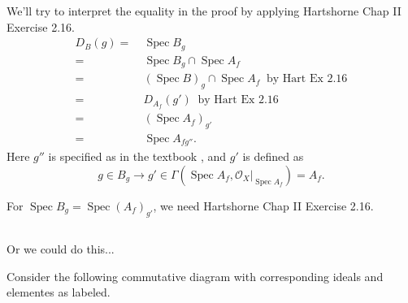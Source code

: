 \section{}
We'll try to interpret the equality in the proof by applying Hartshorne \cite{hartshorne2013algebraic} Chap II Exercise 2.16.
\begin{align*}
	D_B(g)=&~ \operatorname{Spec}B_g\\
	=&~ \operatorname{Spec}B_g\cap \operatorname{Spec}A_f\\
	=&~ (\operatorname{Spec}B)_g \cap \operatorname{Spec}A_f ~\text{ by Hart Ex 2.16}\\
	=&~ D_{A_f}(g') ~\text{ by Hart Ex 2.16}\\
	=&~ (\operatorname{Spec}A_f)_{g'}\\
	=&~ \operatorname{Spec}A_{fg''}.
\end{align*}
Here $g''$ is specified as in the textbook \cite{RaviRisingSea}, and $g'$ is defined as \[g\in B_g\to g'\in\Gamma(\operatorname{Spec}A_f,\mathcal O_X\vert_{\operatorname{Spec}A_f})=A_f.\]

For $\operatorname{Spec} B_g=\operatorname{Spec}(A_f)_{g'}$, we need \cite{hartshorne2013algebraic} Hartshorne Chap II Exercise 2.16. 

\begin{comment}
See this \href{https://youtu.be/EWnhf0BdAWA?si=zMjtGhr12HSCjzNr}{VIDEO}, this \href{https://math.stackexchange.com/questions/384137/intersection-of-open-affines-can-be-covered-by-open-sets-distinguished-in-both}{POST}.

See \href{http://mathbabysteps.blogspot.com/2016/12/affine-communication-lemma.html}{POST}, \href{https://math.stackexchange.com/questions/4146296/declaremathoperator-specspecdoubt-about-nikes-lemma-about-the-intersecti}{POST}.
\end{comment}

\subsection{}

Or we could do this...

Consider the following commutative diagram with corresponding ideals and elementes as labeled.

